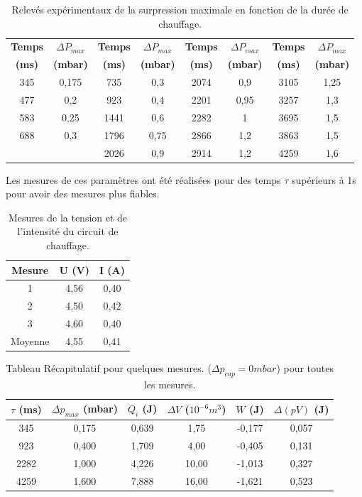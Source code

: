 \documentclass[a4paper,9pt,french]{scrartcl}
\begin{document}
\begin{table}[H]
\centering
\small
\begin{tabular}{|cc|cc|cc|cc|}
\hline
\textbf{Temps} & \textbf{$\Delta P_{max}$} & \textbf{Temps} & \textbf{$\Delta P_{max}$} & \textbf{Temps} & \textbf{$\Delta P_{max}$} & \textbf{Temps} & \textbf{$\Delta P_{max}$} \\ 
\textbf{(ms)} & \textbf{(mbar)} & \textbf{(ms)} & \textbf{(mbar)} & \textbf{(ms)} & \textbf{(mbar)} & \textbf{(ms)} & \textbf{(mbar)} \\ \hline
345  & 0,175 & 735  & 0,3  & 2074 & 0,9  & 3105 & 1,25 \\
477  & 0,2   & 923  & 0,4  & 2201 & 0,95 & 3257 & 1,3  \\
583  & 0,25  & 1441 & 0,6  & 2282 & 1    & 3695 & 1,5  \\
688  & 0,3   & 1796 & 0,75 & 2866 & 1,2  & 3863 & 1,5  \\
     &       & 2026 & 0,9  & 2914 & 1,2  & 4259 & 1,6  \\ \hline
\end{tabular}
\caption{Relevés expérimentaux de la surpression maximale en fonction de la durée de chauffage.}
\end{table}
Les mesures de ces paramètres ont été réalisées pour des temps $\tau$ supérieurs à 1s pour avoir des mesures plus fiables.
\begin{table}[H]
\centering
\begin{tabular}{|c|c|c|}
\hline
\textbf{Mesure} & \textbf{U (V)} & \textbf{I (A)} \\ \hline
1 & 4,56 & 0,40 \\ \hline
2 & 4,50 & 0,42 \\ \hline
3 & 4,60 & 0,40 \\ \hline
Moyenne & 4,55 & 0,41 \\ \hline
\end{tabular}
\caption{Mesures de la tension et de l'intensité du circuit de chauffage.}
\end{table}

\begin{table}[H]
\centering
\begin{tabular}{|c|c|c|c|c|c|}
\hline
$\tau$ (ms) & $\Delta p_{max}$ (mbar) & $Q_i$ (J) & $\Delta V$ ($10^{-6} m^3$) & $W$ (J) & $\Delta(pV)$ (J) \\ \hline
345 & 0,175 & 0,639 & 1,75 & -0,177 & 0,057 \\ \hline
923 & 0,400 & 1,709 & 4,00 & -0,405 & 0,131 \\ \hline
2282 & 1,000 & 4,226 & 10,00 & -1,013 & 0,327 \\ \hline
4259 & 1,600 & 7,888 & 16,00 & -1,621 & 0,523 \\ \hline
\end{tabular}
\caption{Tableau Récapitulatif pour quelques mesures. ($\Delta p_{cap} = 0 mbar$) pour toutes les mesures.}
\end{table}
\end{document}
